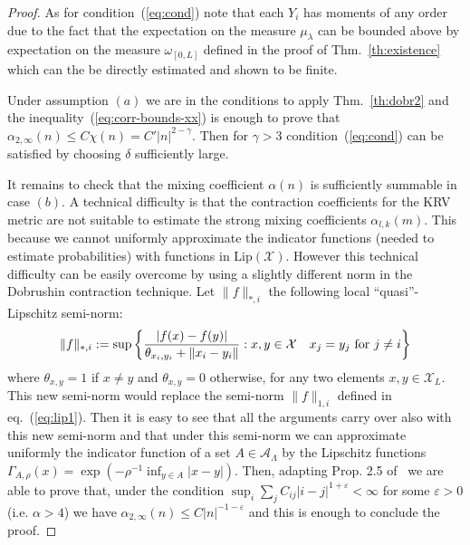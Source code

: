\documentclass[a4paper,12pt,reqno]{amsart}
\newtheorem{remark}[theorem]{Remark}
\newcommand{\eps}{\varepsilon}
\newcommand{\R}{\mathbb{R}}
\newcommand{\A}{\mathcal{A}}
\newcommand{\X}{\mathcal{X}}
\begin{document}
\begin{proof}
As for condition~(\ref{eq:cond}) note that each $Y_i$ has moments of
any order due to the fact that the expectation on the measure
$\mu_\lambda$ can be bounded above by expectation on the measure
$\omega_{[0,L]}$ defined in the proof of Thm.~\ref{th:existence} which
can the be directly estimated and shown to be finite. 

Under assumption $(a)$ we are in the conditions to apply Thm.~\ref{th:dobr2} and the inequality~(\ref{eq:corr-bounds-xx}) is enough to
prove that $\alpha_{2,\infty}(n) \le C \chi(n) = C' |n|^{2-\gamma}$. Then for $\gamma > 3$ condition~(\ref{eq:cond}) can be satisfied by choosing $\delta$ sufficiently large.

It remains to check that the mixing coefficient $\alpha(n)$ is
sufficiently summable in case $(b)$. A technical difficulty is that the contraction coefficients for the KRV metric are not suitable to estimate the strong mixing coefficients $\alpha_{l,k}(m)$. This
because we cannot uniformly approximate the indicator functions (needed to estimate probabilities) with
functions in $\mathrm{Lip}(\X)$. However this technical difficulty can
be easily overcome by using a slightly different norm in the Dobrushin
contraction technique.
Let $\|f\|_{*,i}$ the following local ``quasi''-Lipschitz semi-norm:
\begin{equation*}
\|f\|_{*,i} :=  \sup \left\{ \frac{|f(x)-f(y)|}{\theta_{x_i,y_i}+\|x_i-y_i\|} :
 x,y \in\X  \quad \text{$ x_j=y_j$ for $j \neq i$} \right\}  
\end{equation*}
where $\theta_{x,y} = 1$ if $x \neq y$ and $\theta_{x,y} = 0$ otherwise,
for any two elements $x,y \in \X_L$.
This new semi-norm would replace the semi-norm $\|f\|_{1,i}$ defined in
eq.~(\ref{eq:lip1}). Then it is easy to see that all the arguments
carry over also with this new semi-norm and that under this semi-norm
we can approximate uniformly the indicator function of a set $A \in
\A_{\Lambda}$ by the Lipschitz functions
$\Gamma_{A,\rho}(x) = \exp(-\rho^{-1}\inf_{y \in A} |x-y|)$. 
Then, adapting Prop. 2.5 of~\cite{kuensch} we are able to prove that,
under the condition  $\sup_i \sum_{j} C_{ij} |i-j|^{1+\eps} <
\infty$ for some $\eps > 0$ (i.e. $\alpha > 4$) we have
$\alpha_{2,\infty}(n) \le C |n|^{-1-\eps}$ and this is enough to
conclude the proof.  
\end{proof}


\end{document}
